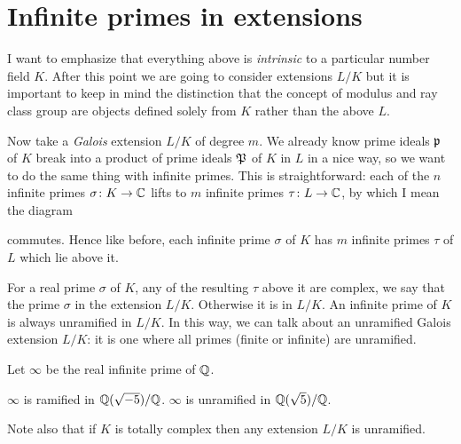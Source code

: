 \section{Infinite primes in extensions}
I want to emphasize that everything above is
\emph{intrinsic} to a particular number field $K$.
After this point we are going to consider extensions $L/K$
but it is important to keep in mind the distinction that
the concept of modulus and ray class group are objects
defined solely from $K$ rather than the above $L$.

Now take a \emph{Galois} extension $L/K$ of degree $m$.
We already know prime ideals $\mathfrak p$ of $K$ break into
a product of prime ideals $\mathfrak P$ of $K$ in $L$ in a nice way,
so we want to do the same thing with infinite primes.
This is straightforward: each of the $n$ infinite primes
$\sigma \colon K \to \mathbb C$ lifts to $m$ infinite primes $\tau \colon L \to \mathbb C$,
by which I mean the diagram
\begin{center}
\end{center}
commutes.
Hence like before, each infinite prime $\sigma$ of $K$
has $m$ infinite primes $\tau$ of $L$ which lie above it.

For a real prime $\sigma$ of $K$, any of the resulting $\tau$ above it
are complex, we say that the prime $\sigma$ 
in the extension $L/K$. Otherwise it is  in $L/K$.
An infinite prime of $K$ is always unramified in $L/K$.
In this way, we can talk about an unramified Galois extension $L/K$:
it is one where all primes (finite or infinite) are unramified.

\begin{example}
	Let $\infty$ be the real infinite prime of $\mathbb Q$.
	\begin{itemize}
		\ii $\infty$ is ramified in $\mathbb Q(\sqrt{-5})/\mathbb Q$.
		\ii $\infty$ is unramified in $\mathbb Q(\sqrt{5})/\mathbb Q$.
	\end{itemize}
	Note also that if $K$ is totally complex
	then any extension $L/K$ is unramified.
\end{example}

